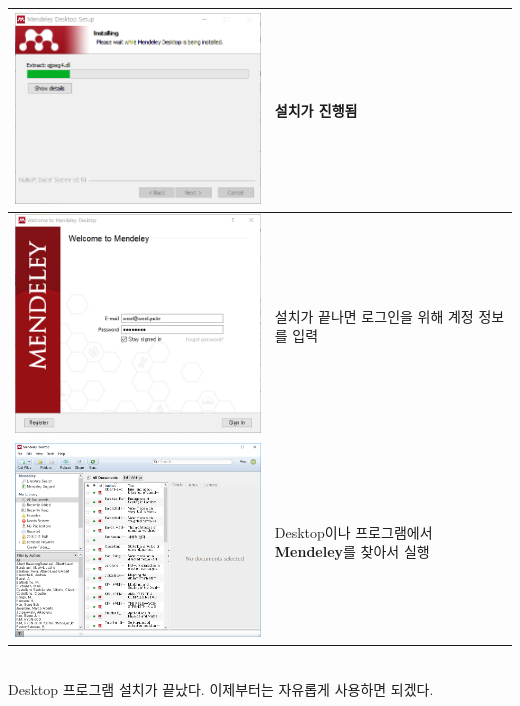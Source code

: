 \documentclass[11pt]{article}
\begin{document}
\begin{tabular}{ m{11cm} m{50mm} }
	\hline
	\centering
	\includegraphics[width=7cm]{./image/desktop4.png} & 설치가 진행됨\\
	\hline
	\centering
	\includegraphics[width=7cm]{./image/desktop5.png} & 설치가 끝나면 로그인을 위해 계정 정보를 입력\\
	\hline
	\includegraphics[width=10cm]{./image/desktop6.png} & Desktop이나 프로그램에서 \textbf{Mendeley}를 찾아서 실행\\
\end{tabular} \\
Desktop 프로그램 설치가 끝났다. 이제부터는 자유롭게 사용하면 되겠다.
\end{document}
